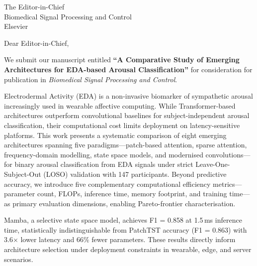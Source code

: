 \documentclass[12pt]{letter}
\begin{document}
\begin{letter}{The Editor-in-Chief\\
Biomedical Signal Processing and Control\\
Elsevier}

\opening{Dear Editor-in-Chief,}

We submit our manuscript entitled \textbf{``A Comparative Study of Emerging Architectures for EDA-based Arousal Classification''} for consideration for publication in \textit{Biomedical Signal Processing and Control}.

Electrodermal Activity (EDA) is a non-invasive biomarker of sympathetic arousal increasingly used in wearable affective computing. While Transformer-based architectures outperform convolutional baselines for subject-independent arousal classification, their computational cost limits deployment on latency-sensitive platforms. This work presents a systematic comparison of eight emerging architectures spanning five paradigms---patch-based attention, sparse attention, frequency-domain modelling, state space models, and modernised convolutions---for binary arousal classification from EDA signals under strict Leave-One-Subject-Out (LOSO) validation with 147 participants. Beyond predictive accuracy, we introduce five complementary computational efficiency metrics---parameter count, FLOPs, inference time, memory footprint, and training time---as primary evaluation dimensions, enabling Pareto-frontier characterisation.

Mamba, a selective state space model, achieves F1 = 0.858 at 1.5\,ms inference time, statistically indistinguishable from PatchTST accuracy (F1 = 0.863) with 3.6$\times$ lower latency and 66\% fewer parameters. These results directly inform architecture selection under deployment constraints in wearable, edge, and server scenarios.


\end{letter}
\end{document}
